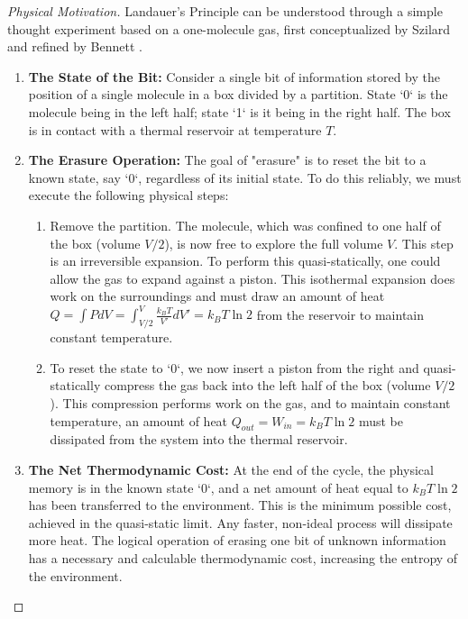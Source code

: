 \documentclass[11pt, letterpaper]{report}
\theoremstyle{plain} %
\theoremstyle{definition} %
\theoremstyle{remark} %
\begin{document}
\begin{proof}[Physical Motivation]
Landauer's Principle can be understood through a simple thought experiment based on a one-molecule gas, first conceptualized by Szilard and refined by Bennett \cite{Landauer1961, Bennett1982}.
\begin{enumerate}
    \item \textbf{The State of the Bit:} Consider a single bit of information stored by the position of a single molecule in a box divided by a partition. State `0` is the molecule being in the left half; state `1` is it being in the right half. The box is in contact with a thermal reservoir at temperature $T$.

    \item \textbf{The Erasure Operation:} The goal of "erasure" is to reset the bit to a known state, say `0`, regardless of its initial state. To do this reliably, we must execute the following physical steps:
    \begin{enumerate}
        \item Remove the partition. The molecule, which was confined to one half of the box (volume $V/2$), is now free to explore the full volume $V$. This step is an irreversible expansion. To perform this quasi-statically, one could allow the gas to expand against a piston. This isothermal expansion does work on the surroundings and must draw an amount of heat $Q = \int P dV = \int_{V/2}^V \frac{k_B T}{V'} dV' = k_B T \ln 2$ from the reservoir to maintain constant temperature.
        \item To reset the state to `0`, we now insert a piston from the right and quasi-statically compress the gas back into the left half of the box (volume $V/2$). This compression performs work on the gas, and to maintain constant temperature, an amount of heat $Q_{out} = W_{in} = k_B T \ln 2$ must be dissipated from the system into the thermal reservoir.
    \end{enumerate}
    \item \textbf{The Net Thermodynamic Cost:} At the end of the cycle, the physical memory is in the known state `0`, and a net amount of heat equal to $k_B T \ln 2$ has been transferred to the environment. This is the minimum possible cost, achieved in the quasi-static limit. Any faster, non-ideal process will dissipate more heat. The logical operation of erasing one bit of unknown information has a necessary and calculable thermodynamic cost, increasing the entropy of the environment.
\end{enumerate}
\end{proof}
\end{document}
